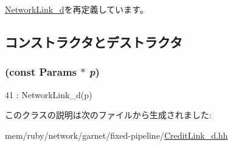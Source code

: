 \hyperlink{classNetworkLink__d_a1384b11c71bbcc86aab6a3a201f7a51e}{NetworkLink\_\-d}を再定義しています。

\subsection{コンストラクタとデストラクタ}
\hypertarget{classCreditLink__d_a8d903e92b8ca522f0ba6448df824989b}{
\subsubsection[{CreditLink\_\-d}]{ (const {\bf Params} $\ast$ {\em p})}}
\label{classCreditLink__d_a8d903e92b8ca522f0ba6448df824989b}



\begin{DoxyCode}
41 : NetworkLink_d(p) {}
\end{DoxyCode}


このクラスの説明は次のファイルから生成されました:\begin{DoxyCompactItemize}
\item 
mem/ruby/network/garnet/fixed-\/pipeline/\hyperlink{CreditLink__d_8hh}{CreditLink\_\-d.hh}\end{DoxyCompactItemize}
